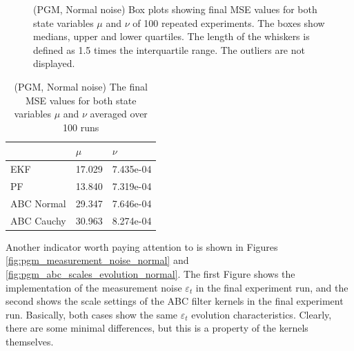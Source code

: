 \begin{figure}[!ht]
\centering
\caption{(PGM, Normal noise) Box plots showing final MSE values for both state variables \(\mu\) and \(\nu\) of 100 repeated experiments. The boxes show medians, upper and lower quartiles. The length of the whiskers is defined as 1.5 times the interquartile range. The outliers are not displayed.}
\label{fig:pgm_mse_boxplot_normal}
\end{figure}

\begin{table}[h!]
\centering
\begin{tabular}{ |p{4cm}|p{4cm}|p{4cm}|}
 \hline 
  & \(\mu\) & \(\nu\)\\
 \hline \hline
 EKF & 17.029    & 7.435e-04  \\
 PF  &   13.840  & 7.319e-04 \\
 ABC Normal & 29.347 & 7.646e-04\\
 ABC Cauchy & 30.963 & 8.274e-04\\
 \hline
\end{tabular}
\caption{(PGM, Normal noise) The final MSE values for both state variables \(\mu\) and \(\nu\) averaged over 100 runs}
\label{table:pgm_mse_normal}
\end{table}

Another indicator worth paying attention to is shown in Figures \ref{fig:pgm_measurement_noise_normal} and \ref{fig:pgm_abc_scales_evolution_normal}. The first Figure shows the implementation of the measurement noise \(\varepsilon_t\) in the final experiment run, and the second shows the scale settings of the ABC filter kernels in the final experiment run. Basically, both cases show the same \(\varepsilon_t\) evolution characteristics. Clearly, there are some minimal differences, but this is a property of the kernels themselves.



